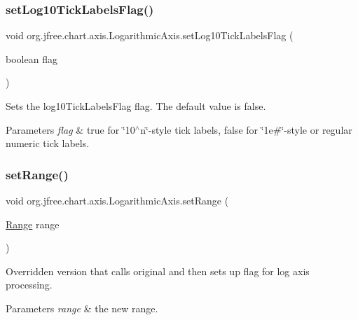 \subsubsection{\texorpdfstring{set\+Log10\+Tick\+Labels\+Flag()}{setLog10TickLabelsFlag()}}
{\footnotesize\ttfamily void org.\+jfree.\+chart.\+axis.\+Logarithmic\+Axis.\+set\+Log10\+Tick\+Labels\+Flag (\begin{DoxyParamCaption}\item[{boolean}]{flag }\end{DoxyParamCaption})}

Sets the \textquotesingle{}log10\+Tick\+Labels\+Flag\textquotesingle{} flag. The default value is false.


\begin{DoxyParams}{Parameters}
{\em flag} & true for \char`\"{}10$^\wedge$n\char`\"{}-\/style tick labels, false for \char`\"{}1e\#\char`\"{}-\/style or regular numeric tick labels. \\
\hline
\end{DoxyParams}
\mbox{\label{classorg_1_1jfree_1_1chart_1_1axis_1_1_logarithmic_axis_ab35f30f437f8263a05d62799d957b340}} 
\subsubsection{\texorpdfstring{set\+Range()}{setRange()}}
{\footnotesize\ttfamily void org.\+jfree.\+chart.\+axis.\+Logarithmic\+Axis.\+set\+Range (\begin{DoxyParamCaption}\item[{\mbox{\hyperlink{classorg_1_1jfree_1_1data_1_1_range}{Range}}}]{range }\end{DoxyParamCaption})}

Overridden version that calls original and then sets up flag for log axis processing.


\begin{DoxyParams}{Parameters}
{\em range} & the new range. \\
\hline
\end{DoxyParams}
\mbox{\label{classorg_1_1jfree_1_1chart_1_1axis_1_1_logarithmic_axis_a95fb80b856ca657a5424fefc5eb04094}} 
